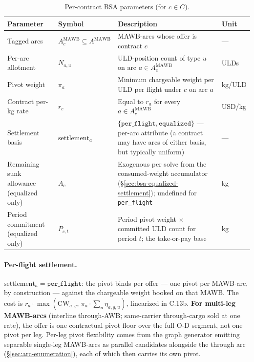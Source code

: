\documentclass[11pt,a4paper]{article}
\theoremstyle{definition}
\begin{document}
\begin{table}[H]
\centering
\caption{Per-contract BSA parameters (for $c \in C$).}
\label{tab:bsa-params}
\begin{tabular}{p{3.5cm}p{2.2cm}p{6.5cm}p{1.5cm}}
\toprule
Parameter & Symbol & Description & Unit \\
\midrule
Tagged arcs & $A_c^{\text{MAWB}} \subseteq A^{\text{MAWB}}$ & MAWB-arcs whose offer is contract $c$ & --- \\
Per-arc allotment & $N_{a,u}$ & ULD-position count of type $u$ on arc $a \in A_c^{\text{MAWB}}$ & ULDs \\
Pivot weight & $\pi_a$ & Minimum chargeable weight per ULD per flight under $c$ on arc $a$ & kg/ULD \\
Contract per-kg rate & $r_c$ & Equal to $r_a$ for every $a \in A_c^{\text{MAWB}}$ & USD/kg \\
Settlement basis & $\text{settlement}_a$ & $\{\texttt{per\_flight}, \texttt{equalized}\}$ --- per-arc attribute (a contract may have arcs of either basis, but typically uniform) & --- \\
Remaining sunk allowance (equalized only) & $A_c$ & Exogenous per solve from the consumed-weight accumulator (\S\ref{sec:bsa-equalized-settlement}); undefined for \texttt{per\_flight} & kg \\
Period commitment (equalized only) & $P_{c,t}$ & Period pivot weight $\times$ committed ULD count for period $t$; the take-or-pay base & kg \\
\bottomrule
\end{tabular}
\end{table}

\paragraph{Per-flight settlement.}
$\text{settlement}_a = \texttt{per\_flight}$: the pivot binds per offer
--- one pivot per MAWB-arc, by construction --- against the chargeable
weight booked on that MAWB. The cost is $r_a \cdot \max(\text{CW}_{a,g},\,
\pi_a \cdot \sum_u \eta_{a,g,u})$, linearized in C.13b. \textbf{For
multi-leg MAWB-arcs} (interline through-AWB; same-carrier through-cargo
sold at one rate), the offer is one contractual pivot floor over the full
O-D segment, not one pivot per leg. Per-leg pivot flexibility comes from
the graph generator emitting separable single-leg MAWB-arcs as parallel
candidates alongside the through arc (\S\ref{sec:arc-enumeration}), each
of which then carries its own pivot.
\end{document}
